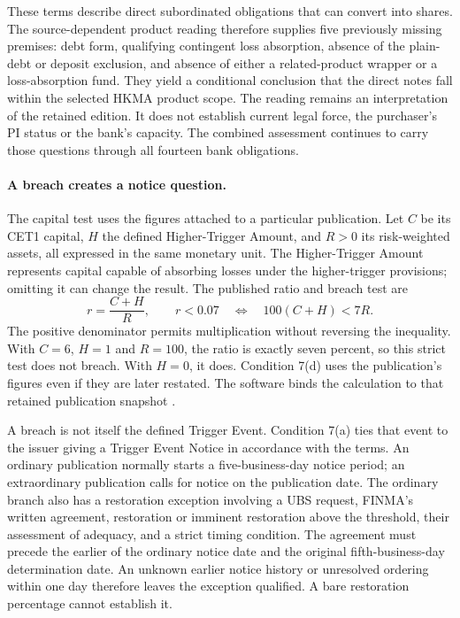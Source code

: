 \documentclass[12pt,a4paper,oneside,openany]{book}
\begin{document}
These terms describe direct subordinated obligations that can convert into
shares. The source-dependent product reading therefore supplies five previously
missing premises: debt form, qualifying contingent loss absorption, absence of
the plain-debt or deposit exclusion, and absence of either a related-product
wrapper or a loss-absorption fund. They yield a conditional conclusion that the
direct notes fall within the selected HKMA product scope. The reading remains
an interpretation of the retained edition. It does not establish current legal
force, the purchaser's PI status or the bank's capacity. The combined assessment
continues to carry those questions through all fourteen bank obligations.

\paragraph{A breach creates a notice question.}
The capital test uses the figures attached to a particular publication.
Let $C$ be its CET1 capital, $H$ the defined Higher-Trigger Amount, and $R>0$
its risk-weighted assets, all expressed in the same monetary unit. The
Higher-Trigger Amount represents capital capable of absorbing losses under
the higher-trigger provisions; omitting it can change the result. The
published ratio and breach test are
\begin{equation}
  r=\frac{C+H}{R},\qquad
  r<0.07\quad\Longleftrightarrow\quad 100(C+H)<7R.
  \label{eq:ubs-trigger-ratio}
\end{equation}
The positive denominator permits multiplication without reversing the
inequality. With $C=6$, $H=1$ and $R=100$, the ratio is exactly seven percent,
so this strict test does not breach. With $H=0$, it does. Condition 7(d)
uses the publication's figures even if they are later restated. The software
binds the calculation to that retained publication snapshot
\citep[definition of Trigger CET1 Ratio; conditions~7(b), 7(d)]{ubsat12024}.

A breach is not itself the defined Trigger Event. Condition 7(a) ties that
event to the issuer giving a Trigger Event Notice in accordance with the
terms. An ordinary publication normally starts a five-business-day notice
period; an extraordinary publication calls for notice on the publication
date. The ordinary branch also has a restoration exception involving a UBS
request, FINMA's written agreement, restoration or imminent restoration above
the threshold, their assessment of adequacy, and a strict timing condition.
The agreement must precede the earlier of the ordinary notice date and the
original fifth-business-day determination date. An unknown earlier notice
history or unresolved ordering within one day therefore leaves the exception
qualified. A bare restoration percentage cannot establish it.
\end{document}
